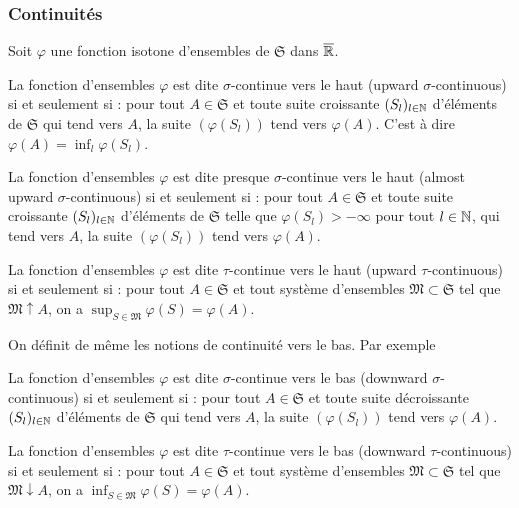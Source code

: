 \subsubsection{Continuités} \label{Continuites}
Soit $\varphi$ une fonction isotone d'ensembles de $\mathfrak{S}$ dans $\overline{\mathbb{R}}$.
\begin{defi}
La fonction d'ensembles $\varphi$ est dite $\sigma$-continue vers le haut (upward $\sigma$-continuous) si et seulement si : pour tout $A \in \mathfrak{S}$ et toute suite croissante $(S_l)_{l\in \mathbb{N}}$ d'éléments de $\mathfrak{S}$ qui tend vers $A$, la suite $(\varphi(S_l))$ tend vers $\varphi(A)$. C'est à dire $\varphi(A) = \inf_{l}\varphi(S_l)$.
\end{defi}
\begin{defi}
La fonction d'ensembles $\varphi$ est dite presque $\sigma$-continue vers le haut (almost upward $\sigma$-continuous) si et seulement si : pour tout $A \in \mathfrak{S}$ et toute suite croissante $(S_l)_{l\in \mathbb{N}}$ d'éléments de $\mathfrak{S}$ telle que $\varphi(S_l)> - \infty$ pour tout $l\in \mathbb{N}$, qui tend vers $A$, la suite $(\varphi(S_l))$ tend vers $\varphi(A)$.
\end{defi}
\begin{defi}
 La fonction d'ensembles $\varphi$ est dite $\tau$-continue vers le haut (upward $\tau$-continuous) si et seulement si :
pour tout $A \in \mathfrak{S}$ et tout système d'ensembles $\mathfrak{M} \subset \mathfrak{S}$ tel que $\mathfrak{M} \uparrow A$, on a $\sup_{S \in \mathfrak{M}}\varphi(S) = \varphi(A)$.
\end{defi}
On définit de même les notions de continuité vers le bas. Par exemple
\begin{defi}
La fonction d'ensembles $\varphi$ est dite $\sigma$-continue vers le bas (downward $\sigma$-continuous) si et seulement si : pour tout $A \in \mathfrak{S}$ et toute suite décroissante $(S_l)_{l\in \mathbb{N}}$ d'éléments de $\mathfrak{S}$ qui tend vers $A$, la suite $(\varphi(S_l))$ tend vers $\varphi(A)$.
\end{defi}
\begin{defi}
 La fonction d'ensembles $\varphi$ est dite $\tau$-continue vers le bas (downward $\tau$-continuous) si et seulement si :
pour tout $A \in \mathfrak{S}$ et tout système d'ensembles $\mathfrak{M} \subset \mathfrak{S}$ tel que $\mathfrak{M} \downarrow A$, on a $\inf_{S \in \mathfrak{M}}\varphi(S) = \varphi(A)$.
\end{defi}

